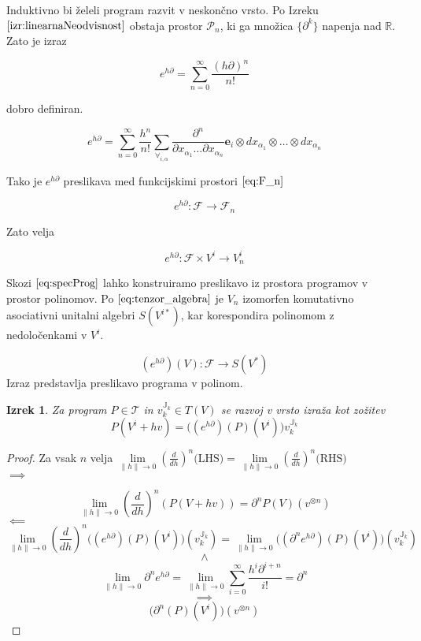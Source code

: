 \documentclass{article}
\newcommand{\RR}{\mathbb{R}}
\newcommand{\JJ}{\mathbb{J}}
\newcommand{\T}{\mathcal{T}}
\newcommand{\e}{\mathbf{e}}
\newcommand{\F}{\mathcal{F}}
\newcommand{\dP}{\mathcal{P}}
\newcommand{\D}{\partial}
\newtheorem{izrek}{Izrek}[section]
\begin{document}
  Induktivno bi želeli program razvit v neskončno vrsto. Po Izreku $\ref{izr:linearnaNeodvisnost}$  obstaja prostor $\dP_n$, ki ga množica $\{\D^k\}$ napenja nad $\RR$. Zato je izraz
  
  
 \begin{equation}
 	e^{h\D}=\sum\limits_{n=0}^{\infty}\frac{(h\D)^n}{n!}
 \end{equation}
 
 dobro definiran.
 
 \begin{equation}\label{eq:e^d}
 	e^{h\D}=\sum\limits_{n=0}^{\infty}\frac{h^n}{n!}\sum_{\forall_{i,\alpha}}\frac{\partial^n}{\partial
 		    x_{\alpha_1}\ldots \partial x_{\alpha_n}}\e_i\otimes
 		  dx_{\alpha_1}\otimes\ldots \otimes dx_{\alpha_n}
 \end{equation}
 
 Tako je $e^{h\D}$ preslikava med funkcijskimi prostori $\eqref{eq:F_n}$
 
 \begin{equation}
 	e^{h\D}:\F\to\F_n
 \end{equation}
 
 Zato velja
  
  \begin{equation}\label{eq:specProg}
  	e^{h\D}:\F\times V^i\to V_n^i
  \end{equation}
  
 
Skozi $\eqref{eq:specProg}$ lahko konstruiramo preslikavo iz prostora programov v prostor polinomov.  Po $\eqref{eq:tenzor_algebra}$ je $V_n$ izomorfen komutativno asociativni unitalni algebri $S(V^{i*})$, kar korespondira polinomom z nedoločenkami v $V^i$.
 
 \begin{equation}
 	(e^{h\D})(V): \F\to S(V^*)
 \end{equation}
 Izraz predstavlja preslikavo programa v polinom.
 
\begin{izrek}
	Za program $P\in\T$ in $v^{\JJ_k}_{k}\in T(V)$ se razvoj v vrsto izraža kot zožitev\\
	\begin{equation}\label{eq:tenzorVrsta}
	P(V^i+hv) = \Big((e^{h\D})(P)(V^i)\Big)v^{\JJ_k}_{k}
	\end{equation}
\end{izrek}
 
 \begin{proof}
 Za vsak $n$ velja $\lim\limits_{\lVert h\rVert\to 0}(\frac{d}{dh})^n\text{(LHS)}=\lim\limits_{\lVert h\rVert\to 0}(\frac{d}{dh})^n\text{(RHS)}$\\
 $\implies$
 
 $$\lim\limits_{\lVert h\rVert\to 0}(\frac{d}{dh})^n(P(V+hv))=\D^n P(V)(v^{\otimes n})$$
 $\impliedby$
 $$\lim\limits_{\lVert h\rVert\to 0}(\frac{d}{dh})^n\Big((e^{h\D})(P)(V^i)\Big)(v^{\JJ_k}_{k})=\lim\limits_{\lVert h\rVert\to 0}\Big((\D^n e^{h\D})(P)(V^i)\Big)(v^{\JJ_k}_{k})$$
 $$\land$$
 $$\lim\limits_{\lVert h\rVert\to 0}\D^ne^{h\D}=\lim\limits_{\lVert h\rVert\to 0}\sum\limits_{i=0}^{\infty}\frac{h^i\D^{i+n}}{i!}=\D^n$$
 $$\implies$$
 $$\Big(\D^n(P)(V^i)\Big)(v^{\otimes n})$$
 \end{proof}
  
\end{document}
